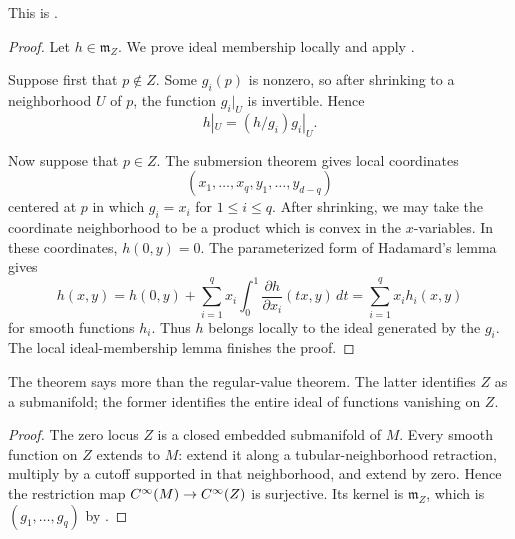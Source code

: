
This is \citet[Chapter~I, Lemma~2.1]{Moerdijk_Reyes_Smooth_Infinitesimal_Analysis}.

\begin{proof}
  Let $h\in\mathfrak m_Z$. We prove ideal membership locally and apply
  .

  Suppose first that $p\notin Z$. Some $g_i(p)$ is nonzero, so after shrinking
  to a neighborhood $U$ of $p$, the function $g_i|_U$ is invertible. Hence
  \[
    h|_U=(h/g_i)g_i|_U.
  \]

  Now suppose that $p\in Z$. The submersion theorem gives local coordinates
  \[
    (x_1,\ldots,x_q,y_1,\ldots,y_{d-q})
  \]
  centered at $p$ in which $g_i=x_i$ for $1\leq i\leq q$. After shrinking,
  we may take the coordinate neighborhood to be a product which is convex in
  the $x$-variables. In these coordinates, $h(0,y)=0$. The parameterized form
  of Hadamard's lemma gives
  \[
    h(x,y)
    =h(0,y)+\sum_{i=1}^q x_i
      \int_0^1\frac{\partial h}{\partial x_i}(tx,y)\,dt
    =\sum_{i=1}^q x_i h_i(x,y)
  \]
  for smooth functions $h_i$. Thus $h$ belongs locally to the ideal generated
  by the $g_i$. The local ideal-membership lemma finishes the proof.
\end{proof}

The theorem says more than the regular-value theorem. The latter identifies
$Z$ as a submanifold; the former identifies the entire ideal of functions
vanishing on $Z$.


\begin{proof}
  The zero locus $Z$ is a closed embedded submanifold of $M$. Every smooth
  function on $Z$ extends to $M$: extend it along a tubular-neighborhood
  retraction, multiply by a cutoff supported in that neighborhood, and extend
  by zero. Hence the restriction map $C^\infty(M)\to C^\infty(Z)$ is surjective.
  Its kernel is $\mathfrak m_Z$, which is $(g_1,\ldots,g_q)$ by
  .
\end{proof}

